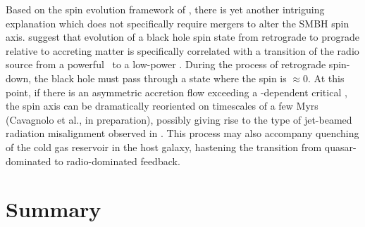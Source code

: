 \documentclass[useAMS,usenatbib]{mn2e}
\begin{document}
Based on the spin evolution framework of \citet{2010arXiv1004.1166G},
there is yet another intriguing explanation which does not
specifically require mergers to alter the SMBH spin
axis. \citet{2010arXiv1004.1166G} suggest that evolution of a black
hole spin state from retrograde to prograde relative to accreting
matter is specifically correlated with a transition of the radio
source from a powerful \frii\ to a low-power \fri. During the process
of retrograde spin-down, the black hole must pass through a state
where the spin is $\approx 0$. At this point, if there is an
asymmetric accretion flow exceeding a \mbh-dependent critical \dmacc,
the spin axis can be dramatically reoriented on timescales of a few
Myrs (Cavagnolo et al., in preparation), possibly giving rise to the
type of jet-beamed radiation misalignment observed in \irs. This
process may also accompany quenching of the cold gas reservoir in the
host galaxy, hastening the transition from quasar-dominated to
radio-dominated feedback.

\section{Summary}
\label{sec:summ}
\end{document}
